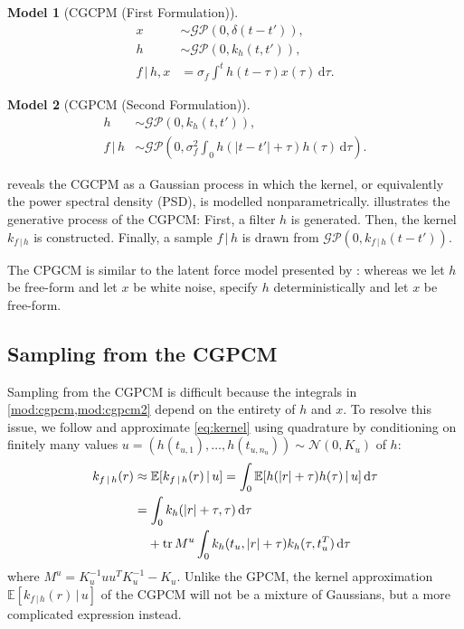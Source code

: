 \documentclass{article}
\newcommand{\tr}{\operatorname{tr}}
\newcommand{\id}[1]{\, \mathrm{d} #1}     %
\newcommand{\cond}{\, | \,}               %
\newcommand{\phan}[1]{\hphantom{#1\;}}
\newtheorem{model}{Model}
\begin{document}
\begin{model}[CGCPM (First Formulation)] \label{mod:cgpcm}
    \begin{align*}
        x &\sim \mathcal{GP}(0,\delta(t-t')), \\
        h &\sim \mathcal{GP}(0, k_h(t,t')), \\
        f\cond h, x &= \sigma_f \int^t h(t- \tau)x(\tau)\id{\tau}.
    \end{align*}
\end{model}
\begin{model}[CGPCM (Second Formulation)] \label{mod:cgpcm2}
    \begin{align*}
        h &\sim \mathcal{GP}(0, k_h(t,t')), \\
        f \cond h &\sim \mathcal{GP}(0,  \sigma_f^2\int_0 h(|t-t'|+\tau)h(\tau)\id{\tau}).
    \end{align*}
\end{model}

 reveals the CGCPM as a Gaussian process in which the kernel, or equivalently the power spectral density (PSD), is modelled nonparametrically.  illustrates the generative process of the CGPCM: First, a filter $h$ is generated. Then, the kernel $k_{f\cond h}$ is constructed. Finally, a sample $f\cond h$ is drawn from $\mathcal{GP}(0,k_{f \cond h}(t-t'))$.

The CPGCM is similar to the latent force model presented by \citet{Alvarez:2009:Latent_Force_Models}: whereas we let $h$ be free-form and let $x$ be white noise, \citet{Alvarez:2009:Latent_Force_Models} specify $h$ deterministically and let $x$ be free-form.

\subsection{Sampling from the CGPCM}
Sampling from the CGPCM is difficult because the integrals in \cref{mod:cgpcm,mod:cgpcm2} depend on the entirety of $h$ and $x$. To resolve this issue, we follow \citet{Tobar:2015:Learning_Stationary} and approximate \cref{eq:kernel} using quadrature \cite{Minka:2000:Quadrature_GP} by conditioning on finitely many values $u=(h(t_{u,1}),\ldots,h(t_{u,n_u}))\sim \mathcal{N}(0,K_u)$ of $h$:
\begin{align*}
    k_{f\cond h}(r)
    &\approx \mathbb{E}[k_{f\cond h}(r)\cond u]
    = \int_{0} \mathbb{E}[h(|r| + \tau) h(\tau)\cond u] \id{\tau} \\
    &= \int_0 k_h(|r| + \tau, \tau) \id{\tau} \\
    &\phan{=}+ \tr M^u \int_{0} k_h(t_u, |r|+ \tau)k_h(\tau, t_u^T) \id{\tau}
\end{align*}
where $M^{u}=K_u^{-1}uu^T K_u^{-1}-K_u$. Unlike the GPCM, the kernel approximation $\mathbb{E}[k_{f\cond h}(r)\cond u]$ of the CGPCM will not be a mixture of Gaussians, but a more complicated expression instead.
\end{document}
